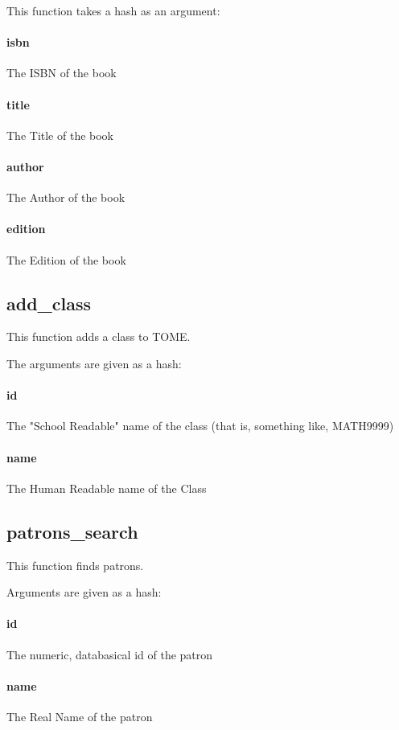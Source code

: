 \documentclass[12pt,titlepage]{article}
\begin{document}
This function takes a hash as an argument:
\paragraph{isbn}
The ISBN of the book 

\paragraph{title}
The Title of the book 

\paragraph{author}
The Author of the book 

\paragraph{edition}
The Edition of the book

\subsection{add_class}
This function adds a class to TOME.

The arguments are given as a hash:
\paragraph{id}
The "School Readable" name of the class (that is, something like, MATH9999) 

\paragraph{name}
The Human Readable name of the Class

\subsection{patrons_search}
This function finds patrons.

Arguments are given as a hash:
\paragraph{id}
The numeric, databasical id of the patron 

\paragraph{name}
The Real Name of the patron 
\end{document}

